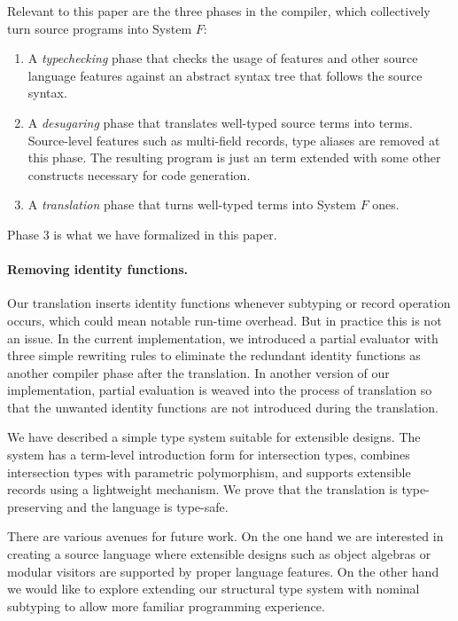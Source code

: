 Relevant to this paper are the three phases in the compiler, which
collectively turn source programs into System $F$:

\begin{enumerate}
\item A \emph{typechecking} phase that checks the usage of \name features and
  other source language features against an abstract syntax tree that follows
  the source syntax.

\item A \emph{desugaring} phase that translates well-typed source terms into
  \name terms. Source-level features such as multi-field records, type aliases
  are removed at this phase. The resulting program is just an \name term
  extended with some other constructs necessary for code generation.

\item A \emph{translation} phase that turns well-typed \name terms into System
  $F$ ones.
\end{enumerate}

Phase 3 is what we have formalized in this paper.

\paragraph{Removing identity functions.} Our translation inserts identity
functions whenever subtyping or record operation occurs, which could mean
notable run-time overhead. But in practice this is not an issue. In the current
implementation, we introduced a partial evaluator with three simple rewriting
rules to eliminate the redundant identity functions as another compiler phase
after the translation. In another version of our implementation, partial
evaluation is weaved into the process of translation so that the unwanted
identity functions are not introduced during the translation.

We have described a simple type system suitable for extensible designs.
The system has a term-level introduction form for intersection types, combines intersection types with
parametric polymorphism, and supports extensible records using a lightweight
mechanism. We prove that the translation is type-preserving and the language is
type-safe.

There are various avenues for future work. On the one hand we are
interested in creating a source language where extensible designs such as object
algebras or modular visitors are supported by proper language features. On the
other hand we would like to explore extending our structural type system with
nominal subtyping to allow more familiar programming experience.
